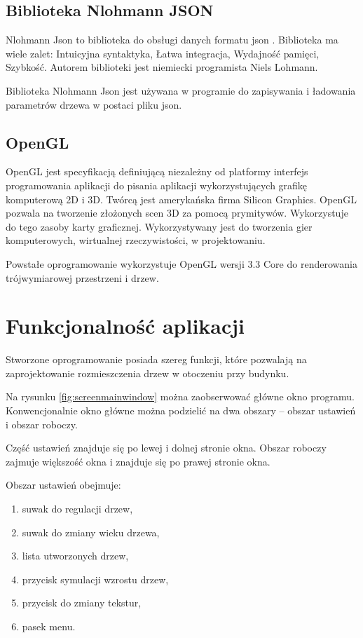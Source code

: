 \documentclass[a4paper,12pt,twoside]{book} %
\begin{document}
\subsection{Biblioteka Nlohmann JSON}

Nlohmann Json to biblioteka do obsługi danych formatu json \cite{nlohmannjson}.
Biblioteka ma wiele zalet: Intuicyjna syntaktyka, Łatwa integracja,
Wydajność pamięci, Szybkość. Autorem biblioteki jest 
niemiecki programista Niels Lohmann.

Biblioteka Nlohmann Json jest używana w programie do zapisywania i 
ładowania parametrów drzewa w postaci pliku json.

\subsection{OpenGL}

OpenGL jest specyfikacją definiującą niezależny od
platformy interfejs programowania aplikacji do pisania 
aplikacji wykorzystujących grafikę komputerową 2D i 3D. 
Twórcą jest amerykańska firma Silicon Graphics. OpenGL pozwala na tworzenie 
złożonych scen 3D za pomocą prymitywów. Wykorzystuje do tego zasoby 
karty graficznej. Wykorzystywany jest do 
tworzenia gier komputerowych, wirtualnej rzeczywistości, w projektowaniu.

Powstałe oprogramowanie wykorzystuje OpenGL wersji 3.3 Core do renderowania trójwymiarowej 
przestrzeni i drzew.

\section{Funkcjonalność aplikacji}

Stworzone oprogramowanie posiada szereg funkcji, które pozwalają na 
zaprojektowanie rozmieszczenia drzew w otoczeniu przy budynku. 

Na rysunku \ref{fig:screenmainwindow} można zaobserwować główne okno programu. 
Konwencjonalnie okno główne można podzielić na dwa obszary -- 
obszar ustawień i obszar roboczy.

Część ustawień znajduje się po lewej i dolnej stronie okna. 
Obszar roboczy zajmuje większość okna i znajduje się po prawej stronie okna.

Obszar ustawień obejmuje:
\begin{enumerate}
	\item suwak do regulacji drzew,
	\item suwak do zmiany wieku drzewa,
	\item lista utworzonych drzew,
	\item przycisk symulacji wzrostu drzew,
	\item przycisk do zmiany tekstur,
	\item pasek menu.
\end{enumerate}
\end{document}
